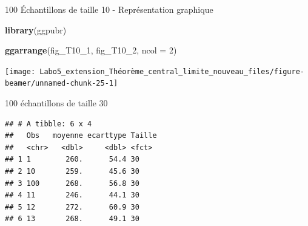 \documentclass[ignorenonframetext,]{beamer}
\newenvironment{Shaded}{\begin{snugshade}}{\end{snugshade}}
\newcommand{\KeywordTok}[1]{\textcolor[rgb]{0.13,0.29,0.53}{\textbf{#1}}}
\newcommand{\DataTypeTok}[1]{\textcolor[rgb]{0.13,0.29,0.53}{#1}}
\newcommand{\DecValTok}[1]{\textcolor[rgb]{0.00,0.00,0.81}{#1}}
\newcommand{\StringTok}[1]{\textcolor[rgb]{0.31,0.60,0.02}{#1}}
\newcommand{\OtherTok}[1]{\textcolor[rgb]{0.56,0.35,0.01}{#1}}
\newcommand{\OperatorTok}[1]{\textcolor[rgb]{0.81,0.36,0.00}{\textbf{#1}}}
\newcommand{\NormalTok}[1]{#1}
\begin{document}
\begin{frame}[fragile]{100 Échantillons de taille 10 - Représentation
graphique}

\begin{Shaded}
\begin{Highlighting}[]
\KeywordTok{library}\NormalTok{(ggpubr)}

\KeywordTok{ggarrange}\NormalTok{(fig_T10_}\DecValTok{1}\NormalTok{, fig_T10_}\DecValTok{2}\NormalTok{, }\DataTypeTok{ncol =} \DecValTok{2}\NormalTok{)}
\end{Highlighting}
\end{Shaded}

\texttt{[image: Labo5\_extension\_Théorème\_central\_limite\_nouveau\_files/figure-beamer/unnamed-chunk-25-1]}

\end{frame}

\begin{frame}[fragile]{100 échantillons de taille 30}

\begin{Shaded}
\end{Shaded}

\begin{verbatim}
## # A tibble: 6 x 4
##   Obs   moyenne ecarttype Taille
##   <chr>   <dbl>     <dbl> <fct> 
## 1 1        260.      54.4 30    
## 2 10       259.      45.6 30    
## 3 100      268.      56.8 30    
## 4 11       246.      44.1 30    
## 5 12       272.      60.9 30    
## 6 13       268.      49.1 30
\end{verbatim}

\end{frame}
\end{document}
